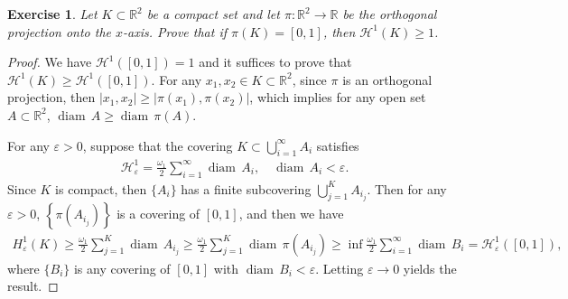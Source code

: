 \documentclass[11pt]{book}
\newtheorem{exercise}{Exercise}[chapter]
\theoremstyle{definition}
\numberwithin{equation}{chapter}
\def\H{{\mathcal H}}
\def\diam{{\operatorname{diam}\,}}
\begin{document}
\begin{exercise}
Let $K\subset\mathbb{R}^2$ be a compact set and let $\pi:\mathbb{R}^2\to\mathbb{R}$ be the orthogonal projection onto the $x$-axis. Prove that if $\pi(K)=[0,1]$, then
$\H^1(K)\geq 1$.
\end{exercise}
\begin{proof}
We have $\H^1([0,1]) = 1$ and it suffices to prove that $\H^1(K) \geq \H^1([0,1])$. For any $x_1, x_2 \in K \subset \mathbb{R}^2$, since $\pi$ is an orthogonal projection, then $\left|x_1,x_2\right| \geq \left|\pi(x_1),\pi(x_2)\right|$, which implies for any open set $A \subset \mathbb{R}^2$, $\diam A \geq \diam \pi(A)$. 

For any $\varepsilon > 0$, suppose that the covering $K \subset \bigcup^\infty_{i=1} A_i$ satisfies \begin{align*}
    \H^1_{\varepsilon} = \frac{\omega_1}{2} \sum^\infty_{i=1}\diam A_i, \quad \diam A_i < \varepsilon.
\end{align*}
Since $K$ is compact, then $\{A_i\}$ has a finite subcovering $\bigcup^K_{j=1}A_{i_j}$. Then for any $\varepsilon > 0$, $\left\{\pi(A_{i_j})\right\}$ is a covering of $[0,1]$, and then we have
\begin{align*}
    H^1_\varepsilon(K) \geq \frac{\omega_1}{2} \sum^K_{j=1} \diam A_{i_j} \geq \frac{\omega_1}{2} \sum^K_{j=1} \diam \pi(A_{i_j}) \geq \inf \frac{\omega_1}{2} \sum^\infty_{i=1} \diam B_i = \H^1_{\varepsilon}([0,1]),
\end{align*}
where $\{B_i\}$ is any covering of $[0,1]$ with $\diam B_i < \varepsilon$. Letting $\varepsilon \to 0$ yields the result.
\end{proof}

\medskip
\end{document}
